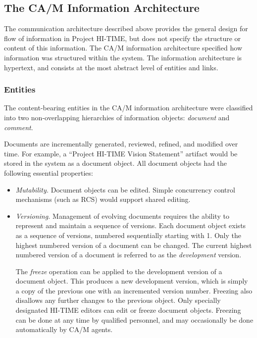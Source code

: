 \subsection{The CA/M Information Architecture}

The communication architecture described above provides the general design
for flow of information in Project HI-TIME, but does not specify the
structure or content of this information.  The CA/M information
architecture specified how information was structured within the system.
The information architecture is hypertext, and consists at the most
abstract level of entities and links.

\subsubsection{Entities}

The content-bearing entities in the CA/M information architecture were
classified into two non-overlapping hierarchies of information objects:
{\em document\/} and {\em comment\/}.

Documents are incrementally generated,
reviewed, refined, and modified over time.  For example, a ``Project
HI-TIME Vision Statement'' artifact would be stored in the system as a document
object.  All document objects had the following essential properties:

\begin{itemize}

\item {\em Mutability.\/} Document objects can be edited.  Simple
  concurrency control mechanisms (such as RCS) would support shared
  editing. 

\item {\em Versioning.\/} Management of evolving documents requires the
  ability to represent and maintain a sequence of versions.  Each
  document object exists as a sequence of versions, numbered sequentially
  starting with 1.  Only the highest numbered version of a document can
  be changed.  The current highest numbered version of a document is
  referred to as the {\em development\/} version.

  The {\em freeze\/} operation can be applied to the development version
  of a document object.  This produces a new development version, which
  is simply a copy of the previous one with an incremented version
  number. Freezing also disallows any further changes to the previous
  object.  Only specially designated HI-TIME editors can edit or freeze
  document objects.  Freezing can be done at any time by qualified
  personnel, and may occasionally be done automatically by CA/M agents.

\end{itemize}



